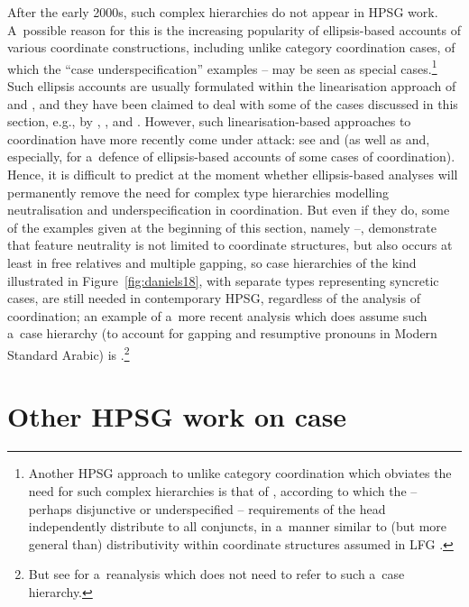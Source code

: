 \documentclass[output=paper
                ,modfonts
                ,nonflat
	        ,collection
	        ,collectionchapter
	        ,collectiontoclongg
 	        ,biblatex
                ,babelshorthands
                ,newtxmath
                ,draftmode
                ,colorlinks, citecolor=brown
]{./langsci/langscibook}
\begin{document}
\begin{exe}
\begin{xlist}
\begin{exe}
\begin{xlist}
After the early 2000s, such complex  hierarchies do not appear in HPSG work.  A~possible
reason for this is the increasing popularity of ellipsis-based accounts of various coordinate
constructions, including unlike category coordination cases, of which the “case underspecification”
examples – may be seen as special cases.\footnote{Another HPSG
  approach to unlike category coordination which obviates the need for such complex hierarchies is
  that of \citet{yata:04}, according to which the – perhaps disjunctive or underspecified –
  requirements of the head independently distribute to all conjuncts, in a~manner similar to (but
  more general than) distributivity within coordinate structures assumed in LFG
  \citep{DK2000a,dal:kin:sad:09,prz:pat:12a}.}  Such ellipsis accounts are usually formulated within
the linearisation approach of \citet{Reape92a,Reape94a} and \citet{Kathol95a}, and they have
been claimed to deal with some of the cases discussed in this section, e.g., by
\citet{Crysmann2003c}, \citet{BS2004a}, and \citet{chav:06,chav:08}.  However, such
linearisation-based approaches to coordination have more recently come under attack: see
\citet{levi:11} and \citet{kub:lev:15} (as well as \citealt{yata:12,Yatabe2016a-u} and, especially,
\citealt{yat:wai:18} for a~defence of ellipsis-based accounts of some cases of coordination).
Hence, it is difficult to predict at the moment whether ellipsis-based analyses will permanently
remove the need for complex type hierarchies modelling neutralisation and underspecification in
coordination.  But even if they do, some of the examples given at the beginning of this section,
namely –, demonstrate that feature neutrality is not limited to
coordinate structures, but also occurs at least in free relatives and multiple gapping, so case
hierarchies of the kind illustrated in Figure~\ref{fig:daniels18}, with separate types representing syncretic cases, are still needed in contemporary HPSG, regardless of the analysis of coordination; an example of a~more recent analysis which does assume such a~case hierarchy (to account for gapping and resumptive pronouns in Modern Standard Arabic) is \citet{AB2013a-u}.\footnote{But see \citet{crys:17} for a~reanalysis which does not need to refer to such a~case hierarchy.}



\section{Other HPSG work on case}
\label{sec:case:other}


\end{xlist}
\end{exe}
\end{xlist}
\end{exe}
\end{document}
